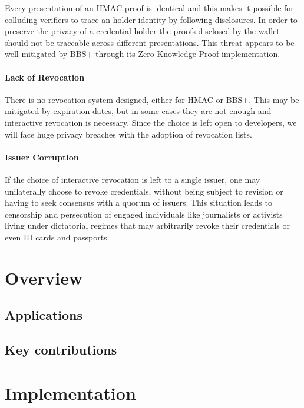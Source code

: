 \documentclass[conference]{IEEEtran}
\begin{document}
Every presentation of an HMAC proof is identical and this makes it possible for colluding verifiers to trace an holder identity by following disclosures. In order to preserve the privacy of a credential holder the proofs disclosed by the wallet should not be traceable across different presentations. This threat appears to be well mitigated by BBS+ through its Zero Knowledge Proof implementation.

\paragraph{Lack of Revocation}

There is no revocation system designed, either for HMAC or BBS+. This may be mitigated by expiration dates, but in some cases they are not enough and interactive revocation is necessary. Since the choice is left open to developers, we will face huge privacy breaches with the adoption of revocation lists.



\paragraph{Issuer Corruption}

If the choice of interactive revocation is left to a single issuer, one may unilaterally choose to revoke credentials, without being subject to revision or having to seek consensus with a quorum of issuers. This situation leads to censorship and persecution of engaged individuals like journalists or activists living under dictatorial regimes that may arbitrarily revoke their credentials or even ID cards and passports.

\section{Overview}

\subsection{Applications}
\subsection{Key contributions}

\section{Implementation}
\end{document}
